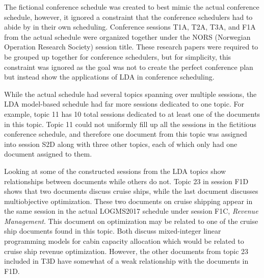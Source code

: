\documentclass[a4paper, 12pt, twoside]{article}
\numberwithin{equation}{section} %
\begin{document}
The fictional conference schedule was created to best mimic the actual conference schedule, however, it ignored a constraint that the conference schedulers had to abide by in their own scheduling. Conference sessions T1A, T2A, T3A, and F1A from the actual schedule were organized together under the NORS (Norwegian Operation Research Society) session title. These research papers were required to be grouped up together for conference schedulers, but for simplicity, this constraint was ignored as the goal was not to create the perfect conference plan but instead show the applications of LDA in conference scheduling.

While the actual schedule had several topics spanning over multiple sessions, the LDA model-based schedule had far more sessions dedicated to one topic. For example, topic 11 has 10 total sessions dedicated to at least one of the documents in this topic. Topic 11 could not uniformly fill up all the sessions in the fictitious conference schedule, and therefore one document from this topic was assigned into session S2D along with three other topics, each of which only had one document assigned to them.

Looking at some of the constructed sessions from the LDA topics show relationships between documents while others do not. Topic 23 in session F1D shows that two documents discuss cruise ships, while the last document discusses multiobjective optimization. These two documents on cruise shipping appear in the same session in the actual LOGMS2017 schedule under session F1C, \textit{Revenue Management}. This document on optimization may be related to one of the cruise ship documents found in this topic. Both discuss mixed-integer linear programming models for cabin capacity allocation which would be related to cruise ship revenue optimization. However, the other documents from topic 23 included in T3D have somewhat of a weak relationship with the documents in F1D. 
\end{document}
